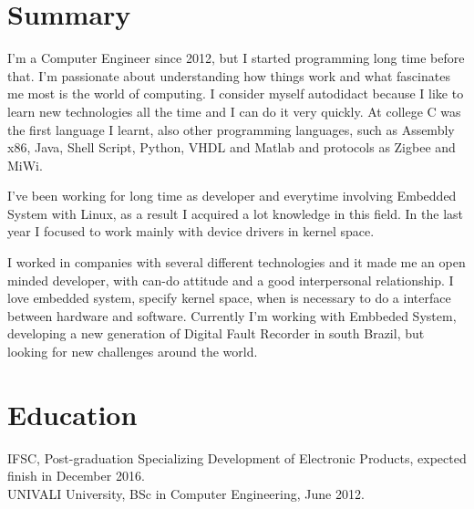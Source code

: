 \documentclass[margin]{res}
\begin{document}
\address{São José, BR \\ diogojusten@gmail.com \\ Phone: +55 (48) 9994-4758 }

\begin{resume}

\section{Summary}
I'm a Computer Engineer since 2012, but I started programming long time before that. I’m passionate about understanding how things work and what fascinates me most is
the world of computing. I consider myself autodidact because I like to learn new technologies all the time and I can do it very quickly. At college C was the first language I learnt, also other programming languages, such as Assembly x86, Java, Shell Script, Python, VHDL and Matlab and protocols as Zigbee and MiWi.

I've been working for long time as developer and everytime involving Embedded System with Linux, as a result I acquired a lot knowledge in this field. In the last year I focused to work mainly with device drivers in kernel space. 

I worked in companies with several different technologies and it made me an open minded developer, with can-do attitude and a good interpersonal relationship. I love embedded system, specify kernel space, when is necessary to do a interface between hardware and software. Currently I’m working with Embbeded System, developing a new generation of Digital Fault Recorder in south Brazil, but looking for new challenges around the world.

\section{Education}
 IFSC, Post-graduation Specializing Development of Electronic Products, expected finish in December 2016.\\
 UNIVALI University, BSc in Computer Engineering, June 2012.


\end{resume}
\end{document}
